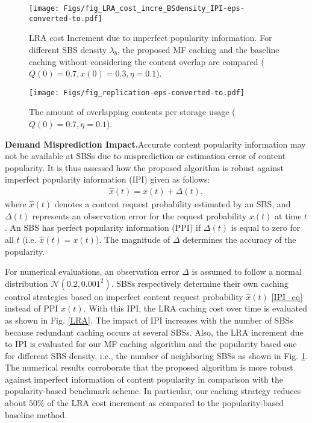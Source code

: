 \documentclass{book}
\begin{document}
            
            
            
            \begin{figure}
            \centering
            \texttt{[image: Figs/fig\_LRA\_cost\_incre\_BSdensity\_IPI-eps-converted-to.pdf]}   %
            \caption{{\small LRA cost Increment due to imperfect popularity information. For different SBS density  $\lambda_b$, the proposed MF caching and the baseline caching without considering the content overlap are compared ($Q(0)=0.7, x(0) =0.3, \eta=0.1$).} }\label{LRA_incre} 
            \end{figure}
            
            \begin{figure}
            \centering
            \texttt{[image: Figs/fig\_replication-eps-converted-to.pdf]}   %
            \caption{{\small The amount of overlapping contents per storage usage ($Q(0)=0.7, \eta=0.1$). } }\label{Repli}
            \end{figure}
            
            \textbf{Demand Misprediction Impact.}\quad Accurate content popularity information may not be available at SBSs due to misprediction or estimation error of content popularity. It is thus assessed how the proposed algorithm is robust against imperfect popularity information (IPI) given as follows:
            \begin{align}
            \hat{x}(t)=x(t)+\Delta(t), \label{IPI_eq}
            \end{align}
            where $\hat{x}(t)$ denotes a content request probability estimated by an SBS, and $\Delta(t)$ represents an observation error for the request probability $x(t)$ at time $t$. An SBS has perfect popularity information (PPI) if $\Delta(t)$ is equal to zero for all $t$ (i.e. $\hat{x}(t)=x(t)$). The magnitude of $\Delta$ determines the accuracy of the popularity. 
             
            For numerical evaluations, an observation error $\Delta$ is assumed to follow a normal distribution $\mathcal{N}(0.2,0.001^2)$. SBSs respectively determine their own caching control strategies based on imperfect content request probability $\hat{x}(t)$ \eqref{IPI_eq} instead of PPI $x(t)$. With this IPI, the LRA caching cost over time is evaluated as shown in Fig. \ref{LRA}. The impact of IPI increases with the number of SBSs because redundant caching occurs at several SBSs.
            Also, the LRA increment due to IPI is evaluated for our MF caching algorithm and the popularity based one for different SBS density, i.e., the number of neighboring SBSs as shown in Fig. \ref{LRA_incre}. 
            The numerical results corroborate that the proposed algorithm is more robust against imperfect information of content popularity in comparison with the popularity-based benchmark scheme. In particular, our caching strategy reduces about $50\%$ of the LRA cost increment as compared to the popularity-based baseline method.
            
\end{document}
